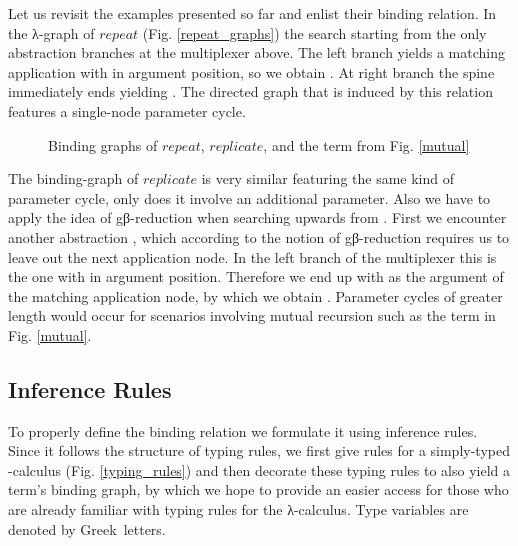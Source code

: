 \documentclass[submission,copyright,creativecommons]{eptcs}
\newcommand\haskell[1]{\ensuremath{\mathit{#1}}}
\renewcommand\;{\,}
\begin{document}
Let us revisit the examples presented so far and enlist their binding
relation. In the λ-graph of \haskell{repeat} (Fig. \ref{repeat_graphs}) the
search starting from the only abstraction  branches at the multiplexer
above. The left branch yields a matching application with  in argument
position, so we obtain . At right branch the spine immediately
ends yielding . The directed graph that is induced by
this relation features a single-node parameter cycle.

\begin{figure}[ht]
\hspace{2cm}
\hspace{2cm}
\caption{Binding graphs of \haskell{repeat}, \haskell{replicate}, and the term from Fig. \ref{mutual}}
\end{figure}

The binding-graph of \haskell{replicate} is very similar featuring the same
kind of parameter cycle, only does it involve an additional parameter. Also we
have to apply the idea of gβ-reduction when searching upwards from . First
we encounter another abstraction , which according to the notion of
gβ-reduction requires us to leave out the next application node. In the left
branch of the multiplexer this is the one with  in argument position.
Therefore we end up with  as the argument of the matching application node,
by which we obtain . Parameter cycles of greater length would occur
for scenarios involving mutual recursion such as the term in Fig. \ref{mutual}.



\subsection{Inference Rules}

To properly define the binding relation we formulate it using inference rules.
Since it follows the structure of typing rules, we first give rules for a
simply-typed -calculus (Fig. \ref{typing_rules}) and then
decorate these typing rules to also yield a term's binding graph, by which we
hope to provide an easier access for those who are already familiar with typing
rules for the λ-calculus. Type variables are denoted by Greek~letters.
\end{document}
